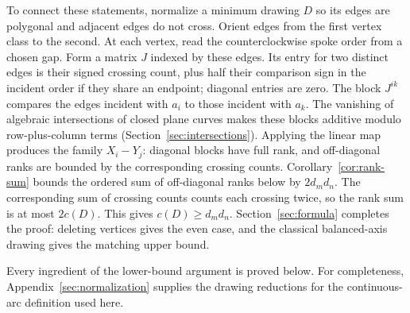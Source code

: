 To connect these statements, normalize a minimum drawing $D$ so its
edges are polygonal and adjacent edges do not cross. Orient edges from
the first vertex class to the second. At each vertex, read the counterclockwise
spoke order from a chosen gap. Form a matrix $J$ indexed by these
edges. Its entry for two distinct edges is their signed crossing count,
plus half their comparison sign in the incident order if they share an
endpoint; diagonal entries are zero. The block $J^{ik}$
compares the edges incident with $a_i$ to those incident with $a_k$.
The vanishing of algebraic intersections of closed plane curves makes
these blocks additive modulo row-plus-column terms
(Section~\ref{sec:intersections}).
Applying the linear map produces
the family $X_i-Y_j$: diagonal blocks have full rank, and off-diagonal
ranks are bounded by the corresponding crossing counts.
Corollary~\ref{cor:rank-sum} bounds the ordered sum of off-diagonal
ranks below by $2d_m d_n$. The corresponding sum of crossing counts
counts each crossing twice, so the rank sum is at most $2c(D)$.
This gives $c(D)\ge d_m d_n$.
Section~\ref{sec:formula} completes the proof: deleting vertices gives
the even case, and the classical balanced-axis drawing gives the
matching upper bound.

Every ingredient of the lower-bound argument is proved below.
For completeness, Appendix~\ref{sec:normalization} supplies the drawing
reductions for the continuous-arc definition used here.

